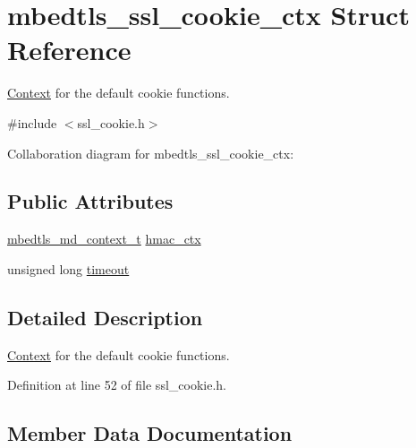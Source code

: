 \hypertarget{structmbedtls__ssl__cookie__ctx}{}\section{mbedtls\+\_\+ssl\+\_\+cookie\+\_\+ctx Struct Reference}
\label{structmbedtls__ssl__cookie__ctx}


\mbox{\hyperlink{struct_context}{Context}} for the default cookie functions.  




{\ttfamily \#include $<$ssl\+\_\+cookie.\+h$>$}



Collaboration diagram for mbedtls\+\_\+ssl\+\_\+cookie\+\_\+ctx\+:
\subsection*{Public Attributes}
\begin{DoxyCompactItemize}
\item 
\mbox{\hyperlink{structmbedtls__md__context__t}{mbedtls\+\_\+md\+\_\+context\+\_\+t}} \mbox{\hyperlink{structmbedtls__ssl__cookie__ctx_a3142057d5ce904db6ee134ff6d5f3b7c}{hmac\+\_\+ctx}}
\item 
unsigned long \mbox{\hyperlink{structmbedtls__ssl__cookie__ctx_adf87598d619f8fcf161965301c423ffb}{timeout}}
\end{DoxyCompactItemize}


\subsection{Detailed Description}
\mbox{\hyperlink{struct_context}{Context}} for the default cookie functions. 

Definition at line 52 of file ssl\+\_\+cookie.\+h.



\subsection{Member Data Documentation}
\mbox{\label{structmbedtls__ssl__cookie__ctx_a3142057d5ce904db6ee134ff6d5f3b7c}} 
